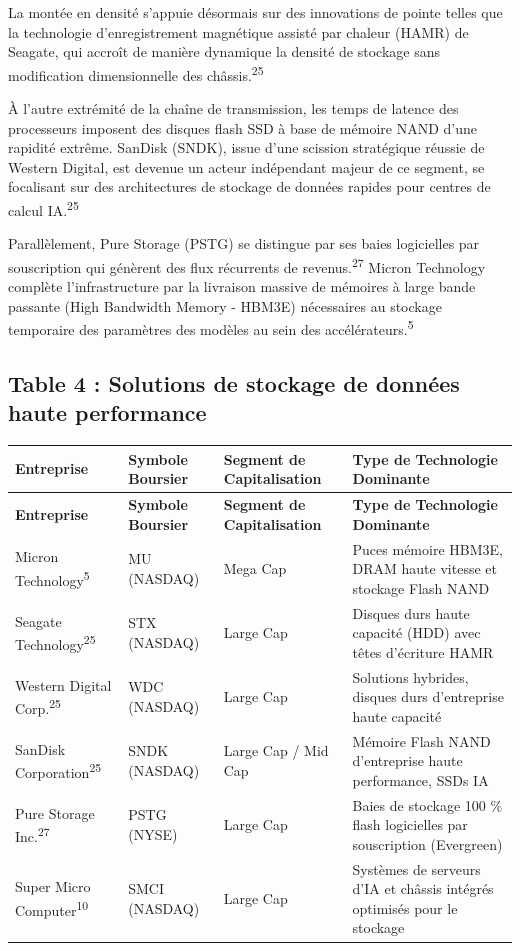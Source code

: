 \documentclass[11pt,a4paper]{article}
\begin{document}
La montée en densité s'appuie désormais sur des innovations de pointe telles que la technologie d'enregistrement magnétique assisté par chaleur (HAMR) de Seagate, qui accroît de manière dynamique la densité de stockage sans modification dimensionnelle des châssis.\textsuperscript{25}

À l'autre extrémité de la chaîne de transmission, les temps de latence des processeurs imposent des disques flash SSD à base de mémoire NAND d'une rapidité extrême. SanDisk (SNDK), issue d'une scission stratégique réussie de Western Digital, est devenue un acteur indépendant majeur de ce segment, se focalisant sur des architectures de stockage de données rapides pour centres de calcul IA.\textsuperscript{25}

Parallèlement, Pure Storage (PSTG) se distingue par ses baies logicielles par souscription qui génèrent des flux récurrents de revenus.\textsuperscript{27} Micron Technology complète l'infrastructure par la livraison massive de mémoires à large bande passante (High Bandwidth Memory - HBM3E) nécessaires au stockage temporaire des paramètres des modèles au sein des accélérateurs.\textsuperscript{5}

\subsection*{Table 4 : Solutions de stockage de données haute performance}
\begin{longtable}{p{3cm} p{3.5cm} p{3cm} p{5cm}}
\toprule
\textbf{Entreprise} & \textbf{Symbole Boursier} & \textbf{Segment de Capitalisation} & \textbf{Type de Technologie Dominante} \\
\midrule
\endfirsthead
\toprule
\textbf{Entreprise} & \textbf{Symbole Boursier} & \textbf{Segment de Capitalisation} & \textbf{Type de Technologie Dominante} \\
\midrule
\endhead
Micron Technology\textsuperscript{5} & MU (NASDAQ) & Mega Cap & Puces mémoire HBM3E, DRAM haute vitesse et stockage Flash NAND \\
Seagate Technology\textsuperscript{25} & STX (NASDAQ) & Large Cap & Disques durs haute capacité (HDD) avec têtes d'écriture HAMR \\
Western Digital Corp.\textsuperscript{25} & WDC (NASDAQ) & Large Cap & Solutions hybrides, disques durs d'entreprise haute capacité \\
SanDisk Corporation\textsuperscript{25} & SNDK (NASDAQ) & Large Cap / Mid Cap & Mémoire Flash NAND d'entreprise haute performance, SSDs IA \\
Pure Storage Inc.\textsuperscript{27} & PSTG (NYSE) & Large Cap & Baies de stockage 100 \% flash logicielles par souscription (Evergreen) \\
Super Micro Computer\textsuperscript{10} & SMCI (NASDAQ) & Large Cap & Systèmes de serveurs d'IA et châssis intégrés optimisés pour le stockage \\
\bottomrule
\end{longtable}
\end{document}
